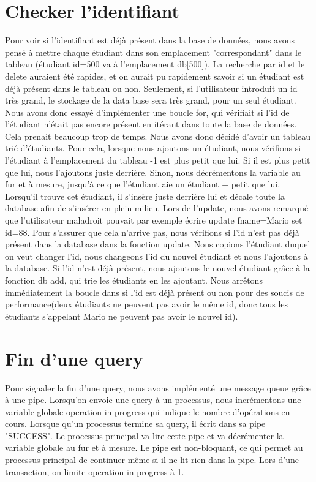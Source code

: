 \documentclass[utf8]{article}
\begin{document}
\section{Checker l'identifiant}
\indent{}
\par
Pour voir si l'identifiant est déjà présent dans la base de données, nous avons pensé à mettre chaque étudiant
dans son emplacement "correspondant" dans le tableau (étudiant id=500 va à l'emplacement db[500]). La recherche par id et le delete auraient été rapides, et on 
aurait pu rapidement savoir si un étudiant est déjà présent dans le tableau ou non.
Seulement, si l'utilisateur introduit un id très grand, le stockage de la data base sera très grand, pour un seul étudiant.
Nous avons donc essayé d'implémenter une boucle for, qui vérifiait si l'id de l'étudiant n'était pas encore présent en itérant dans toute la base de données.
Cela prenait beaucoup trop de temps. Nous avons donc décidé d'avoir un tableau trié d'étudiants. Pour cela, lorsque nous ajoutons un étudiant,
nous vérifions si l'étudiant à l'emplacement du tableau -1 est plus petit que lui. Si il est plus petit que lui, nous l'ajoutons juste derrière. Sinon, 
nous décrémentons la variable au fur et à mesure, jusqu'à ce que l'étudiant aie un étudiant + petit que lui. Lorsqu'il trouve cet étudiant, il s'insère juste derrière lui
et décale toute la database afin de s'insérer en plein milieu.
Lors de l'update, nous avons remarqué que l'utilisateur maladroit pouvait par exemple écrire update fname=Mario set id=88.
Pour s'assurer que cela n'arrive pas, nous vérifions si l'id n'est pas déjà présent dans la database dans la fonction update.
Nous copions l'étudiant duquel on veut changer l'id, nous changeons l'id du nouvel étudiant et nous l'ajoutons à la database. Si l'id 
n'est déjà présent, nous ajoutons le nouvel étudiant grâce à la fonction db add, qui trie les étudiants en les ajoutant.
Nous arrêtons immédiatement la boucle dans si l'id est déjà présent ou non pour des soucis de performance(deux étudiants ne peuvent pas avoir le même id, 
donc tous les étudiants s'appelant Mario ne peuvent pas avoir le nouvel id). 
\par
\section{Fin d'une query}

\indent{}
\par
Pour signaler la fin d'une query, nous avons implémenté une message queue grâce à une pipe. Lorsqu'on envoie 
une query à un processus, nous incrémentons une variable globale operation in progress qui indique le nombre d'opérations en cours.
Lorsque qu'un processus termine sa query, il écrit dans sa pipe "SUCCESS". Le processus principal va lire cette pipe et va décrémenter
la variable globale au fur et à mesure. Le pipe est non-bloquant, ce qui permet au processus principal de continuer
même si il ne lit rien dans la pipe. Lors d'une transaction, on limite operation in progress à 1.
\end{document}
